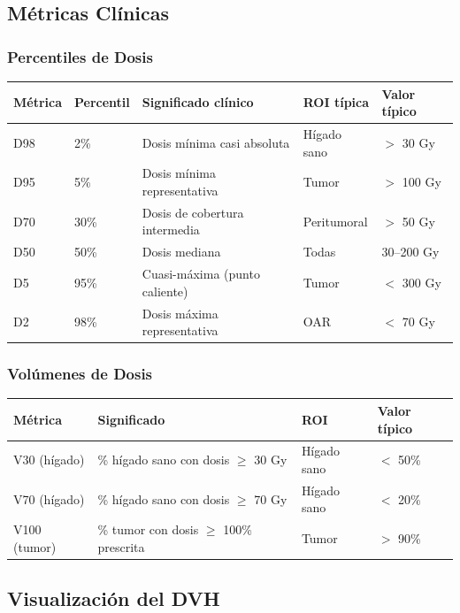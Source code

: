 \documentclass[12pt,a4paper]{article}
\begin{document}
\subsection{Métricas Clínicas}

\subsubsection{Percentiles de Dosis}

\begin{tabular}{p{2.5cm} p{2cm} p{4cm} p{2.5cm} p{2.5cm}}
\toprule
\textbf{Métrica} & \textbf{Percentil} & \textbf{Significado clínico} & \textbf{ROI típica} & \textbf{Valor típico} \\
\midrule
D98 & 2\% & Dosis mínima casi absoluta & Hígado sano & $>$ 30 Gy \\
D95 & 5\% & Dosis mínima representativa & Tumor & $>$ 100 Gy \\
D70 & 30\% & Dosis de cobertura intermedia & Peritumoral & $>$ 50 Gy \\
D50 & 50\% & Dosis mediana & Todas & 30--200 Gy \\
D5 & 95\% & Cuasi-máxima (punto caliente) & Tumor & $<$ 300 Gy \\
D2 & 98\% & Dosis máxima representativa & OAR & $<$ 70 Gy \\
\bottomrule
\end{tabular}

\subsubsection{Volúmenes de Dosis}

\begin{tabular}{p{3cm} p{4cm} p{2.5cm} p{3cm}}
\toprule
\textbf{Métrica} & \textbf{Significado} & \textbf{ROI} & \textbf{Valor típico} \\
\midrule
V30 (hígado) & \% hígado sano con dosis $\geq$ 30 Gy & Hígado sano & $<$ 50\% \\
V70 (hígado) & \% hígado sano con dosis $\geq$ 70 Gy & Hígado sano & $<$ 20\% \\
V100 (tumor) & \% tumor con dosis $\geq$ 100\% prescrita & Tumor & $>$ 90\% \\
\bottomrule
\end{tabular}

\subsection{Visualización del DVH}
\end{document}
